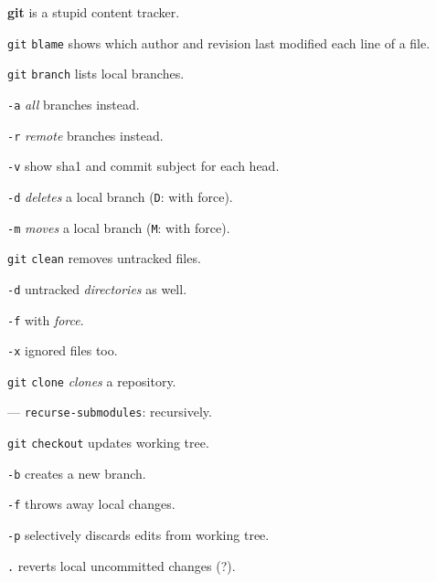 \documentclass{reference_card}
\begin{document}
\renewcommand{\footrulewidth}{0.4pt}
\fancyfoot[LF]{}

\begin{multicols*}{3}
\textbf{git} is a stupid content tracker.

\begin{compactenum}
\item [\texttt{git}] \texttt{blame} shows which author and revision last modified each line of a file.
\end{compactenum}

\begin{compactenum}
\item [\texttt{git}] \texttt{branch} lists local branches.
\item [\texttt{-a}] \emph{all} branches instead.
\item [\texttt{-r}] \emph{remote} branches instead.
\item [\texttt{-v}] show sha1 and commit subject for each head.
\item [\texttt{-d}] \emph{deletes} a local branch (\texttt{D}: with force).
\item [\texttt{-m}] \emph{moves} a local branch (\texttt{M}: with force).
\end{compactenum}

\begin{compactenum}
\item [\texttt{git}] \texttt{clean} removes untracked files.
\item [\texttt{-d}] untracked \emph{directories} as well.
\item [\texttt{-f}] with \emph{force}.
\item [\texttt{-x}] ignored files too.
\end{compactenum}

\begin{compactenum}
\item [\texttt{git}] \texttt{clone} \emph{clones} a repository.
\item [---] \texttt{recurse-submodules}: recursively.
\end{compactenum}

\begin{compactenum}
\item [\texttt{git}] \texttt{checkout} updates working tree.
\item [\texttt{-b}] creates a new branch.
\item [\texttt{-f}] throws away local changes.
\item [\texttt{-p}] selectively discards edits from working tree.
\item [\texttt{.}] reverts local uncommitted changes (?).
\end{compactenum}


\end{multicols*}
\end{document}
